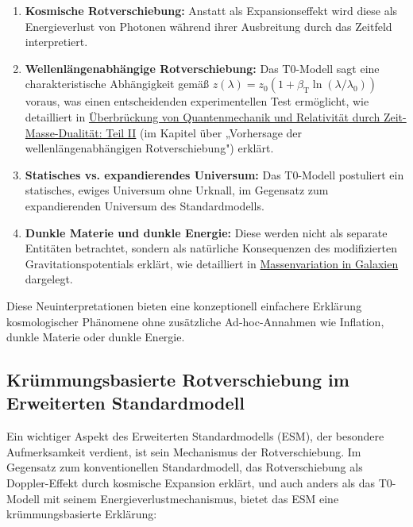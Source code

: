 \documentclass[12pt,a4paper]{article}
\newcommand{\betaT}{\beta_{\text{T}}}
\begin{document}
	\begin{enumerate}
		\item \textbf{Kosmische Rotverschiebung:} Anstatt als Expansionseffekt wird diese als Energieverlust von Photonen während ihrer Ausbreitung durch das Zeitfeld interpretiert.
		
		\item \textbf{Wellenlängenabhängige Rotverschiebung:} Das T0-Modell sagt eine charakteristische Abhängigkeit gemäß $z(\lambda) = z_0 (1 + \betaT \ln(\lambda/\lambda_0))$ voraus, was einen entscheidenden experimentellen Test ermöglicht, wie detailliert in \href{https://github.com/jpascher/T0-Time-Mass-Duality/tree/main/2/pdf/English/QMRelTimeMassPart2En.pdf}{Überbrückung von Quantenmechanik und Relativität durch Zeit-Masse-Dualität: Teil II} (im Kapitel über „Vorhersage der wellenlängenabhängigen Rotverschiebung") erklärt.
		
		\item \textbf{Statisches vs. expandierendes Universum:} Das T0-Modell postuliert ein statisches, ewiges Universum ohne Urknall, im Gegensatz zum expandierenden Universum des Standardmodells.
		
		\item \textbf{Dunkle Materie und dunkle Energie:} Diese werden nicht als separate Entitäten betrachtet, sondern als natürliche Konsequenzen des modifizierten Gravitationspotentials erklärt, wie detailliert in \href{https://github.com/jpascher/T0-Time-Mass-Duality/tree/main/2/pdf/English/MassVarGalaxienEn.pdf}{Massenvariation in Galaxien} dargelegt.
	\end{enumerate}
	
	Diese Neuinterpretationen bieten eine konzeptionell einfachere Erklärung kosmologischer Phänomene ohne zusätzliche Ad-hoc-Annahmen wie Inflation, dunkle Materie oder dunkle Energie.
	
	\subsection{Krümmungsbasierte Rotverschiebung im Erweiterten Standardmodell}
	\label{subsec:esm_redshift}
	
	Ein wichtiger Aspekt des Erweiterten Standardmodells (ESM), der besondere Aufmerksamkeit verdient, ist sein Mechanismus der Rotverschiebung. Im Gegensatz zum konventionellen Standardmodell, das Rotverschiebung als Doppler-Effekt durch kosmische Expansion erklärt, und auch anders als das T0-Modell mit seinem Energieverlustmechanismus, bietet das ESM eine krümmungsbasierte Erklärung:
	
\end{document}
